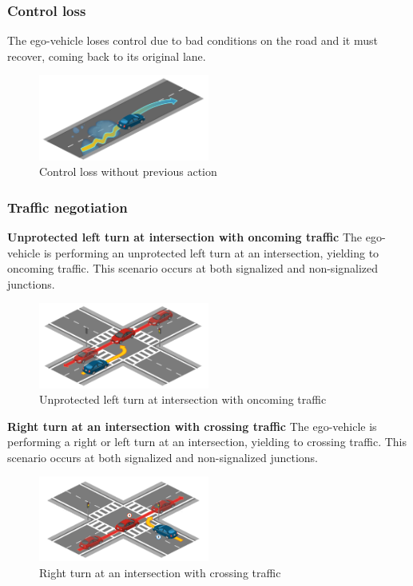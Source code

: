 \documentclass{article}
\begin{document}
\subsubsection{Control loss}
The ego-vehicle loses control due to bad conditions on the road and it must recover, coming back to its original lane.
\begin{figure}[h]
    \centering
    \includegraphics[width=0.5\textwidth]{img/TR01.png}
    \caption{Control loss without previous action} \label{Scenario_controlLoss}
\end{figure}

\subsubsection{Traffic negotiation}
\textbf{Unprotected left turn at intersection with oncoming traffic}
The ego-vehicle is performing an unprotected left turn at an intersection, yielding to oncoming traffic. This scenario occurs at both signalized and non-signalized junctions.
\begin{figure}[h]
    \centering
    \includegraphics[width=0.5\textwidth]{img/TR08.png}
    \caption{Unprotected left turn at intersection with oncoming traffic} \label{leftTurn}
\end{figure}

\textbf{Right turn at an intersection with crossing traffic} 
The ego-vehicle is performing a right or left turn at an intersection, yielding to crossing traffic. This scenario occurs at both signalized and non-signalized junctions.
\begin{figure}[h]
    \centering
    \includegraphics[width=0.5\textwidth]{img/TR09.png}
    \caption{Right turn at an intersection with crossing traffic} \label{rightTurn}
\end{figure}
\end{document}
